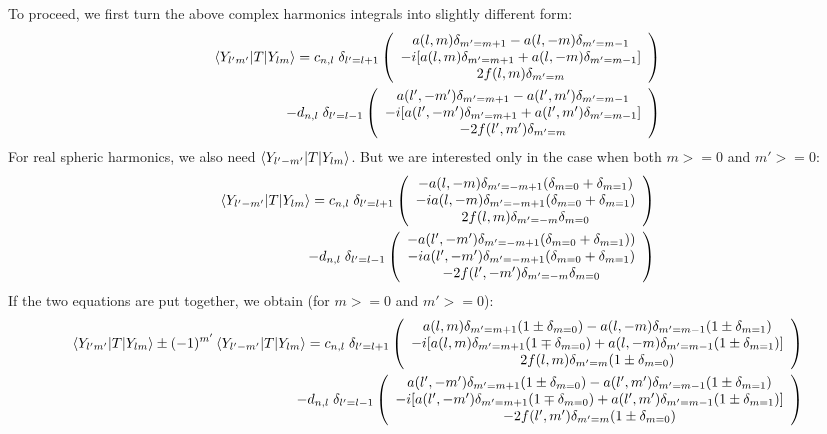 \documentclass[aps,prb,floatfix,epsfig,singlecolumn,showpacs,preprintnumbers]{revtex4}
\begin{document}
To proceed, we
first turn the above complex harmonics integrals into slightly different form:
\begin{eqnarray}
\braket{Y_{l'm'}|T|Y_{lm}}=c_{n,l}\;\delta_{l'=l+1}
\left(
\begin{array}{c}
a(l,m) \delta_{m'=m+1}- a(l,-m)\delta_{m'=m-1}\\
-i[a(l,m)\delta_{m'=m+1}+a(l,-m)\delta_{m'=m-1} ]\\
2 f(l,m)\delta_{m'=m}
\end{array}
\right)
\nonumber\\
-d_{n,l}\;\delta_{l'=l-1}
\left(
\begin{array}{c}
a(l',-m')\delta_{m'=m+1}-a(l',m')\delta_{m'=m-1}\\
-i[a(l',-m')\delta_{m'=m+1}+a(l',m')\delta_{m'=m-1}]\\
-2 f(l',m')\delta_{m'=m}
\end{array}
\right)
\end{eqnarray}
For real spheric harmonics, we also need
$\braket{Y_{l'-m'}|T|Y_{lm}}$. But we are interested only in the case
when both $m>=0$ and $m'>=0$:
\begin{eqnarray}
\braket{Y_{l'-m'}|T|Y_{lm}}=c_{n,l}\;\delta_{l'=l+1}
\left(
\begin{array}{c}
-a(l,-m)\delta_{m'=-m+1}(\delta_{m=0}+\delta_{m=1})\\
-i a(l,-m)\delta_{m'=-m+1}(\delta_{m=0}+\delta_{m=1}) \\
2 f(l,m)\delta_{m'=-m}\delta_{m=0}
\end{array}
\right)
\nonumber\\
-d_{n,l}\;
\delta_{l'=l-1}
\left(
\begin{array}{c}
-a(l',-m')\delta_{m'=-m+1}(\delta_{m=0}+\delta_{m=1}))\\
-i a(l',-m')\delta_{m'=-m+1}(\delta_{m=0}+\delta_{m=1})\\
-2 f(l',-m')\delta_{m'=-m}\delta_{m=0}
\end{array}
\right)
\end{eqnarray}
If the two equations are put together, we obtain (for $m>=0$ and $m'>=0$):
\begin{eqnarray}
\braket{Y_{l' m'}|T|Y_{lm}}\pm (-1)^{m'}\braket{Y_{l' -m'}|T|Y_{lm}}=
c_{n,l}\;\delta_{l'=l+1}
\left(
\begin{array}{c}
a(l,m) \delta_{m'=m+1}(1\pm\delta_{m=0})-  a(l,-m)\delta_{m'=m-1}(1\pm\delta_{m=1}) \\
-i[  a(l,m)\delta_{m'=m+1}(1\mp\delta_{m=0})+a(l,-m)\delta_{m'=m-1}(1\pm\delta_{m=1})]  \\
2 f(l,m)\delta_{m'=m} (1\pm\delta_{m=0})
\end{array}
\right)
%
\nonumber\\
%
-d_{n,l}\;
\delta_{l'=l-1}
\left(
\begin{array}{c}
a(l',-m')\delta_{m'=m+1}(1\pm\delta_{m=0})-a(l',m')\delta_{m'=m-1}(1\pm\delta_{m=1})\\
-i[a(l',-m')\delta_{m'=m+1}(1\mp\delta_{m=0})+a(l',m')\delta_{m'=m-1}(1\pm\delta_{m=1})] \\
-2 f(l',m')\delta_{m'=m}(1\pm\delta_{m=0})
\end{array}
\right)
\nonumber
\end{eqnarray}
\end{document}
